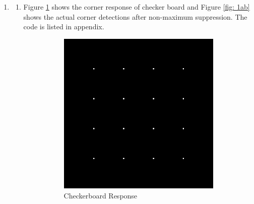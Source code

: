 \documentclass[12pt]{article}
\begin{document}
	\begin{enumerate}
	\item 
	\begin{enumerate}
	\item 
	Figure \ref{fig: 1aa} shows the corner response of checker board and Figure \ref{fig: 1ab} shows the actual corner detections after non-maximum suppression. The code is listed in appendix.
		\begin{figure}[H]
			\centering
			\begin{subfigure}[t]{0.5\textwidth}
				\centering
				\includegraphics[width=\textwidth]{response_img.png}
				\caption{Checkerboard Response}
				\label{fig: 1aa}
			\end{subfigure}%
			~ 
			\begin{subfigure}[t]{0.5\textwidth}
				\centering

\end{subfigure}
\end{figure}
\end{enumerate}
\end{enumerate}
\end{document}
